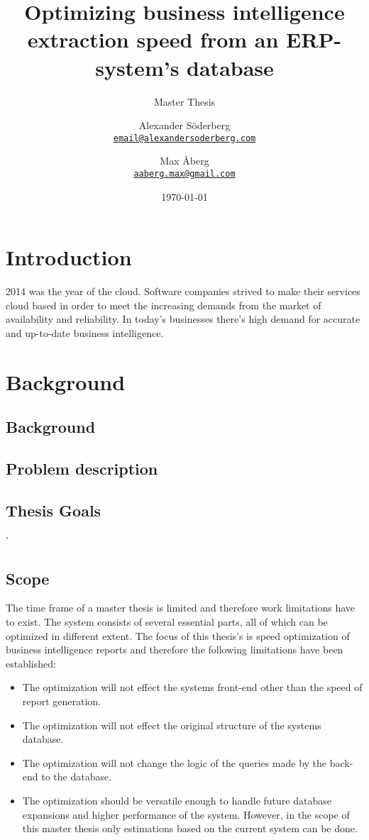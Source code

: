 \documentclass{cslthse-msc}
\author{
	Alexander Söderberg \\
	{\normalsize \href{mailto:email@alexandersoderberg.com}{\texttt{email@alexandersoderberg.com}}}
	\and
	Max Åberg \\
    {\normalsize \href{mailto:aaberg.max@gmail.com}{\texttt{aaberg.max@gmail.com}}}
}
\title{Optimizing business intelligence
extraction speed from an
ERP-system’s database}
\subtitle{Master Thesis}
\date{\today}
\begin{document}
\makefrontmatter
\chapter[Introduction]{Introduction}
2014 was the year of the cloud. Software companies strived to make their services cloud based in order to meet the increasing demands from the market of availability and reliability. 
In today's businesses there's high demand for accurate and up-to-date business intelligence.

\chapter{Background}
\section{Background}

\section{Problem description}
\section{Thesis Goals}'


\section{Scope}
The time frame of a master thesis is limited and therefore work limitations have to exist. The system consists of several essential parts, all of which can be optimized in different extent. The focus of this thesis's is speed optimization of business intelligence reports and therefore the following limitations have been established:
\begin{itemize}
\item The optimization will not effect the systems front-end other than the speed of report generation.
\item The optimization will not effect the original structure of the systems database.
\item The optimization will not change the logic of the queries made by the back-end to the database.
\item The optimization should be versatile enough to handle future database expansions and higher performance of the system. However, in the scope of this master thesis only estimations based on the current system can be done.
\end{itemize}
\end{document}
